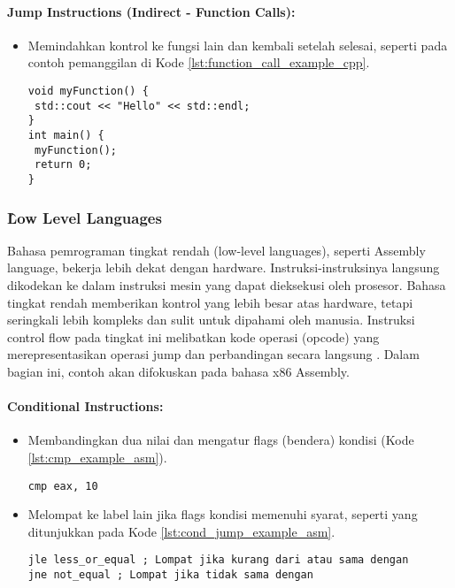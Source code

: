\paragraph{Jump Instructions (Indirect - Function Calls):}
\begin{itemize}
	\item {} Memindahkan kontrol ke fungsi lain dan kembali setelah selesai, seperti pada contoh pemanggilan  di Kode \ref{lst:function_call_example_cpp}.
	      \begin{verbatim}
void myFunction() {
 std::cout << "Hello" << std::endl;
}
int main() {
 myFunction();
 return 0;
}
    \end{verbatim}
    \label{lst:function_call_example_cpp}
\end{itemize}

\subsubsection{\f{Low Level Languages}}
Bahasa pemrograman tingkat rendah (low-level languages), seperti Assembly language, bekerja lebih dekat dengan hardware. Instruksi-instruksinya langsung dikodekan ke dalam instruksi mesin yang dapat dieksekusi oleh prosesor. Bahasa tingkat rendah memberikan kontrol yang lebih besar atas hardware, tetapi seringkali lebih kompleks dan sulit untuk dipahami oleh manusia. Instruksi control flow pada tingkat ini melibatkan kode operasi (opcode) yang merepresentasikan operasi jump dan perbandingan secara langsung \cite{USC24}. Dalam bagian ini, contoh akan difokuskan pada bahasa x86 Assembly.

\paragraph{Conditional Instructions:}
\begin{itemize}
	\item {} Membandingkan dua nilai dan mengatur flags (bendera) kondisi (Kode \ref{lst:cmp_example_asm}).
	      \begin{verbatim}     
cmp eax, 10
    \end{verbatim}
    \label{lst:cmp_example_asm}

	\item {} Melompat ke label lain jika flags kondisi memenuhi syarat, seperti yang ditunjukkan pada Kode \ref{lst:cond_jump_example_asm}.
	      \begin{verbatim}     
jle less_or_equal ; Lompat jika kurang dari atau sama dengan
jne not_equal ; Lompat jika tidak sama dengan
    \end{verbatim}
    \label{lst:cond_jump_example_asm}
\end{itemize}

